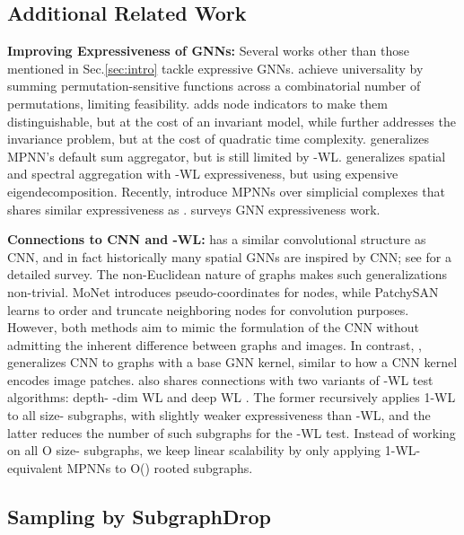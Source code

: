 


\subsection{Additional Related Work}
\label{apdx:related}
{\bf Improving Expressiveness of GNNs:} Several works other than those mentioned in Sec.\ref{sec:intro} tackle expressive GNNs. \citet{murphy2019relational} achieve universality by summing permutation-sensitive functions across a combinatorial number of permutations, limiting feasibility. \citet{coloring} adds node indicators to make them distinguishable, but at the cost of an invariant model, while \citet{NEURIPS2020_a32d7eea} further addresses the invariance problem, but at the cost of quadratic time complexity. \citet{pna} generalizes MPNN's default sum aggregator, but is still limited by -WL.  \citet{dgn_icml21} generalizes spatial and spectral aggregation with -WL expressiveness, but using expensive eigendecomposition.  Recently, \cite{mpsn_icml21} introduce MPNNs over simplicial complexes that shares similar expressiveness as \method.  \cite{azizian2021expressive} surveys GNN expressiveness work.


\textbf{Connections to CNN and -WL:} 
\method has a similar convolutional structure as CNN, and in fact historically many spatial GNNs are inspired by CNN; see \citet{wu2020comprehensive} for a detailed survey. The non-Euclidean nature of graphs makes such generalizations non-trivial. MoNet \citep{monet} introduces pseudo-coordinates for nodes, while PatchySAN \citep{patchy} learns to order and truncate neighboring nodes for convolution purposes. However, both methods aim to mimic the formulation of the CNN without admitting the inherent difference between graphs and images. In contrast, \method, generalizes CNN to graphs with a base GNN kernel, similar to how a CNN kernel encodes image patches. \method also shares connections with two variants of -WL test algorithms: depth- -dim WL \citep{cai1992optimal, weisfeiler1976construction} and deep WL \citep{arvind2020weisfeiler}.  The former recursively applies 1-WL to all size- subgraphs, with slightly weaker expressiveness than -WL, and the latter reduces the number of such subgraphs for the -WL test.  Instead of working on all O size- subgraphs, we keep linear scalability by only applying 1-WL-equivalent MPNNs to O() rooted subgraphs. 


\subsection{Sampling by SubgraphDrop}
\label{apdx:subgraphdrop}

